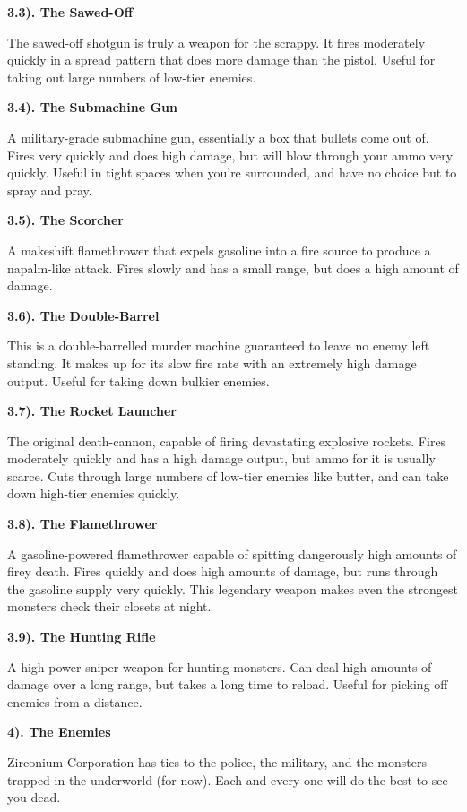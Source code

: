 \documentclass[12pt]{article}
\begin{document}
\begin{flushleft}
\textbf{3.3). The Sawed-Off}

The sawed-off shotgun is truly a weapon for the scrappy. It fires moderately quickly in a spread pattern that does more damage than the pistol. Useful for taking out large numbers of low-tier enemies.

\textbf{3.4). The Submachine Gun}

A military-grade submachine gun, essentially a box that bullets come out of. Fires very quickly and does high damage, but will blow through your ammo very quickly. Useful in tight spaces when you're surrounded, and have no choice but to spray and pray.

\textbf{3.5). The Scorcher}

A makeshift flamethrower that expels gasoline into a fire source to produce a napalm-like attack. Fires slowly and has a small range, but does a high amount of damage.

\textbf{3.6). The Double-Barrel}

This is a double-barrelled murder machine guaranteed to leave no enemy left standing. It makes up for its slow fire rate with an extremely high damage output. Useful for taking down bulkier enemies.

\textbf{3.7). The Rocket Launcher}

The original death-cannon, capable of firing devastating explosive rockets. Fires moderately quickly and has a high damage output, but ammo for it is usually scarce. Cuts through large numbers of low-tier enemies like butter, and can take down high-tier enemies quickly.

\textbf{3.8). The Flamethrower}

A gasoline-powered flamethrower capable of spitting dangerously high amounts of firey death. Fires quickly and does high amounts of damage, but runs through the gasoline supply very quickly. This legendary weapon makes even the strongest monsters check their closets at night.

\textbf{3.9). The Hunting Rifle}

A high-power sniper weapon for hunting monsters. Can deal high amounts of damage over a long range, but takes a long time to reload. Useful for picking off enemies from a distance.

\textbf{4). The Enemies}

Zirconium Corporation has ties to the police, the military, and the monsters trapped in the underworld (for now). Each and every one will do the best to see you dead.


\end{flushleft}
\end{document}
